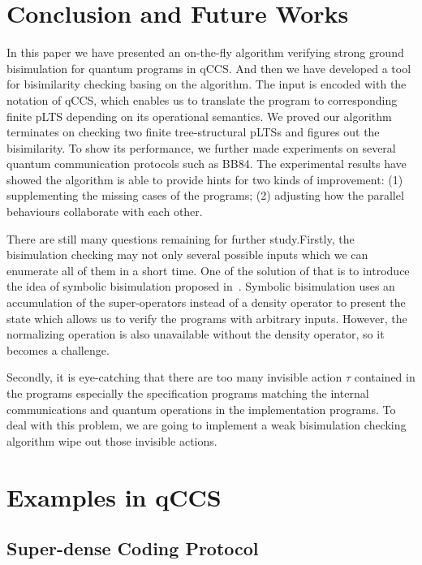 \documentclass[a4paper,UKenglish,cleveref, autoref]{lipics-v2019}
\begin{document}
\section{Conclusion and Future Works}
In this paper we have presented an on-the-fly algorithm verifying strong ground bisimulation for quantum programs in qCCS. And then we have developed a tool for bisimilarity checking basing on the algorithm. The input is encoded with the notation of qCCS, which enables us to translate the program to corresponding finite pLTS depending on its operational semantics. We proved our algorithm terminates on checking two finite tree-structural pLTSs and figures out the bisimilarity. To show its performance, we further made experiments on several quantum communication protocols such as BB84. The experimental results have showed the algorithm is able to provide hints for two kinds of improvement: (1) supplementing the missing cases of the programs; (2) adjusting how the parallel behaviours collaborate with each other.

There are still many questions remaining for further study.Firstly, the bisimulation checking may not only several possible inputs which we can enumerate all of them in a short time. One of the solution of that is to introduce the idea of symbolic bisimulation proposed in~\cite{FDY14}. Symbolic bisimulation uses an accumulation of the super-operators instead of a density operator to present the state which allows us to verify the programs with arbitrary inputs. However, the normalizing operation is also unavailable without the density operator, so it becomes a challenge.

Secondly, it is eye-catching that there are too many invisible action $\tau$ contained in the programs especially the specification programs matching the internal communications and quantum operations in the implementation programs. To deal with this problem, we are going to implement a weak bisimulation checking algorithm wipe out those invisible actions. 






\appendix

\section{Examples in qCCS}
\subsection{Super-dense Coding Protocol}
\end{document}
